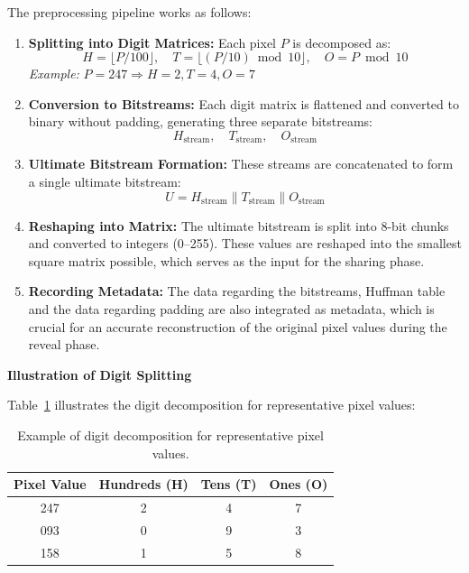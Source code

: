 The preprocessing pipeline works as follows:
\begin{enumerate}
    \item \textbf{Splitting into Digit Matrices:} Each pixel $P$ is decomposed as:
    \begin{equation}
H = \lfloor P / 100 \rfloor, \quad T = \lfloor (P / 10) \bmod 10 \rfloor, \quad O = P \bmod 10
\end{equation}
    \textit{Example:} $P = 247 \Rightarrow H = 2, T = 4, O = 7$
 
    \item \textbf{Conversion to Bitstreams:} Each digit matrix is flattened and converted to binary without padding, generating three separate bitstreams:
    \begin{equation}
H_{\text{stream}}, \quad T_{\text{stream}}, \quad O_{\text{stream}}
\end{equation}
 
    \item \textbf{Ultimate Bitstream Formation:} These streams are concatenated to form a single ultimate bitstream:
    \begin{equation}
U = H_{\text{stream}} \| T_{\text{stream}} \| O_{\text{stream}}
\end{equation}
 
    \item \textbf{Reshaping into Matrix:} The ultimate bitstream is split into 8-bit chunks and converted to integers (0--255). These values are reshaped into the smallest square matrix possible, which serves as the input for the sharing phase.
 
    \item \textbf{Recording Metadata:} The data regarding the bitstreams, Huffman table and the data regarding padding are also integrated as metadata, which is crucial for an accurate reconstruction of the original pixel values during the reveal phase.
\end{enumerate}
 
\textbf{Illustration of Digit Splitting}
 
Table~\ref{tab:ddp_illustration} illustrates the digit decomposition for representative pixel values:
 
\begin{table}[t]
\centering
\caption{Example of digit decomposition for representative pixel values.}
\label{tab:ddp_illustration}
\begin{tabular}{cccc}
\toprule
\textbf{Pixel Value} & \textbf{Hundreds (H)} & \textbf{Tens (T)} & \textbf{Ones (O)} \\
\midrule
247 & 2 & 4 & 7 \\
093 & 0 & 9 & 3 \\
158 & 1 & 5 & 8 \\
\bottomrule
\end{tabular}
\end{table}
 
